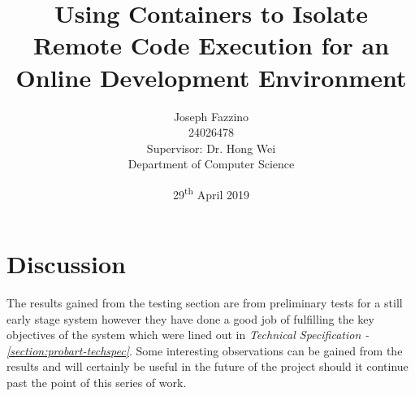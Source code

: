 \documentclass[12pt, a4paper]{extreport}
\title{Using Containers to Isolate Remote Code Execution for an Online Development Environment}
\author{
    Joseph Fazzino\\
    24026478\\
    [4cm]{Supervisor: Dr. Hong Wei}\\
    Department of Computer Science
}
\date{29\textsuperscript{th} April 2019}
\begin{document}
\maketitle
\setcounter{tocdepth}{1}
\tableofcontents
\pagebreak



\pagebreak



\pagebreak

















\chapter{Discussion}


The results gained from the testing section are from preliminary tests for a still early stage system however they have done a good job of fulfilling the key objectives of the system which were lined out in \textit{Technical Specification - \ref{section:probart-techspec}}. Some interesting observations can be gained from the results and will certainly be useful in the future of the project should it continue past the point of this series of work. 
\end{document}
